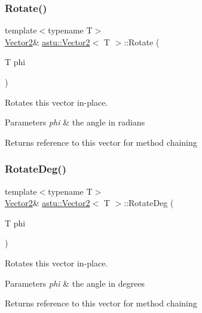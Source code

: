 \subsubsection{\texorpdfstring{Rotate()}{Rotate()}}
{\footnotesize\ttfamily template$<$typename T$>$ \\
\hyperlink{classastu_1_1Vector2}{Vector2}\& \hyperlink{classastu_1_1Vector2}{astu\+::\+Vector2}$<$ T $>$\+::Rotate (\begin{DoxyParamCaption}\item[{T}]{phi }\end{DoxyParamCaption})\hspace{0.3cm}{\ttfamily [inline]}}

Rotates this vector in-\/place.


\begin{DoxyParams}{Parameters}
{\em phi} & the angle in radians \\
\hline
\end{DoxyParams}
\begin{DoxyReturn}{Returns}
reference to this vector for method chaining 
\end{DoxyReturn}
\mbox{\label{classastu_1_1Vector2_a85d7593d86a8b74bb3a0a07b3d734ccd}} 
\subsubsection{\texorpdfstring{Rotate\+Deg()}{RotateDeg()}}
{\footnotesize\ttfamily template$<$typename T$>$ \\
\hyperlink{classastu_1_1Vector2}{Vector2}\& \hyperlink{classastu_1_1Vector2}{astu\+::\+Vector2}$<$ T $>$\+::Rotate\+Deg (\begin{DoxyParamCaption}\item[{T}]{phi }\end{DoxyParamCaption})\hspace{0.3cm}{\ttfamily [inline]}}

Rotates this vector in-\/place.


\begin{DoxyParams}{Parameters}
{\em phi} & the angle in degrees \\
\hline
\end{DoxyParams}
\begin{DoxyReturn}{Returns}
reference to this vector for method chaining 
\end{DoxyReturn}
\mbox{\label{classastu_1_1Vector2_a043ad479fa5cd5d91eae37a06e3b8e96}} 
